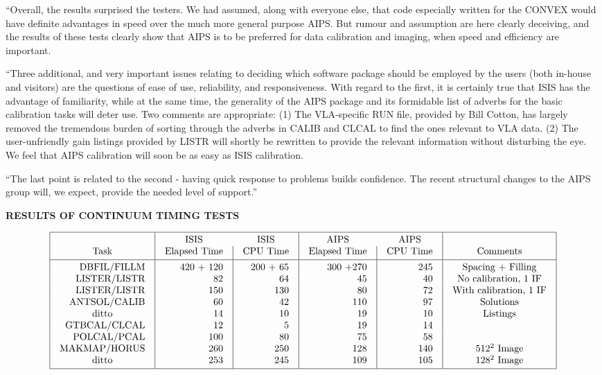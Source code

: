 {   ``Overall, the results surprised the testers.  We had assumed, along
with everyone else, that code especially written for the CONVEX would have
definite advantages in speed over the much more general purpose AIPS.  But
rumour and assumption are here clearly deceiving, and the results of these
tests clearly show that AIPS is to be preferred for data calibration and
imaging, when speed and efficiency are important.

``Three additional, and very important issues relating to deciding which
software package should be employed by the users (both in-house and visitors)
are the questions of ease of use, reliability, and responsiveness.
With regard to the first, it is certainly true that ISIS has
the advantage of familiarity, while at the same time, the generality of the
AIPS package and its formidable list of adverbs for the basic calibration
tasks will deter use.
Two comments are
appropriate:   (1) The VLA-specific RUN file, provided by Bill Cotton, has
largely removed the tremendous burden of sorting through the adverbs in CALIB
and CLCAL to find the ones relevant to VLA data.  (2) The user-unfriendly
gain listings provided by LISTR will shortly be rewritten to provide the
relevant information without disturbing the eye.  We feel that AIPS
calibration will soon be as easy as ISIS calibration.

   ``The last point is related to the second - having quick response to
problems builds confidence.  The recent structural changes to the AIPS group
will, we expect, provide the needed level of support.''


}

{\vskip 0.25in
\centerline{\bf RESULTS OF CONTINUUM TIMING TESTS}
\medskip
{\smaller
$$\vbox{\offinterlineskip
\hrule
\halign{&\vrule#&\strut\quad\hfil#\quad\cr
height2pt&\omit&&\omit&\omit&\omit&&\omit&\omit&\omit&&\omit&\cr
&\omit&&ISIS\hfil&\omit&ISIS\hfil&&AIPS\hfil&\omit&AIPS\hfil&&\omit&\cr
&Task\hfil&&Elapsed Time\hfil&&CPU Time\hfil&&Elapsed Time\hfil&&
	CPU Time\hfil&&Comments\hfil&\cr
height2pt&\omit&&\omit&&\omit&&\omit&&\omit&&\omit&\cr
\noalign{\hrule}
height2pt&\omit&&\omit&&\omit&&\omit&&\omit&&\omit&\cr
&DBFIL/FILLM&&420 + 120&&200 + 65&&300 +270&&245&&Spacing + Filling\hfil&\cr
&LISTER/LISTR&&82&&64&&45&&40&&No calibration, 1 IF\hfil&\cr
&LISTER/LISTR&&150&&130&&80&&72&&With calibration, 1 IF\hfil&\cr
&ANTSOL/CALIB&&60&&42&&110&&97&&Solutions\hfil&\cr
&ditto\hfil&&14&&10&&19&&10&&Listings\hfil&\cr
&GTBCAL/CLCAL&&12&&5&&19&&14&&\omit&\cr
&POLCAL/PCAL&&100&&80&&75&&58&&\omit&\cr
&MAKMAP/HORUS&&260&&250&&128&&140&&$512^2$ Image\hfil&\cr
&ditto\hfil&&253&&245&&109&&105&&$128^2$ Image\hfil&\cr
height2pt&\omit&&\omit&&\omit&&\omit&&\omit&&\omit&\cr}
\hrule}$$}}


